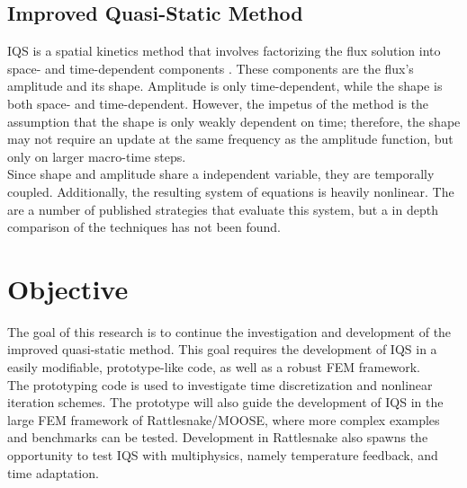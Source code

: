 \subsection{Improved Quasi-Static Method}

IQS is a spatial kinetics method that involves factorizing the flux solution into space- and time-dependent components \cite{Ott_1966,Dulla2008}.  These components are the flux's amplitude and its shape. Amplitude is only time-dependent, while the shape is both space- and time-dependent.  However, the impetus of the method is the assumption that the shape is only weakly dependent on time; therefore, the shape may not require an update at the same frequency as the amplitude function, but only on larger macro-time steps. \\
\indent Since shape and amplitude share a independent variable, they are temporally coupled. Additionally, the resulting system of equations is heavily nonlinear.  The are a number of published strategies that evaluate this system, but a in depth comparison of the techniques has not been found.  

\section{Objective}

The goal of this research is to continue the investigation and development of the improved quasi-static method.  This goal requires the development of IQS in a easily modifiable, prototype-like code, as well as a robust FEM framework. \\
\indent The prototyping code is used to investigate time discretization and nonlinear iteration schemes. The prototype will also guide the development of IQS in the large FEM framework of Rattlesnake/MOOSE, where more complex examples and benchmarks can be tested.  Development in Rattlesnake also spawns the opportunity to test IQS with multiphysics, namely temperature feedback, and time adaptation.